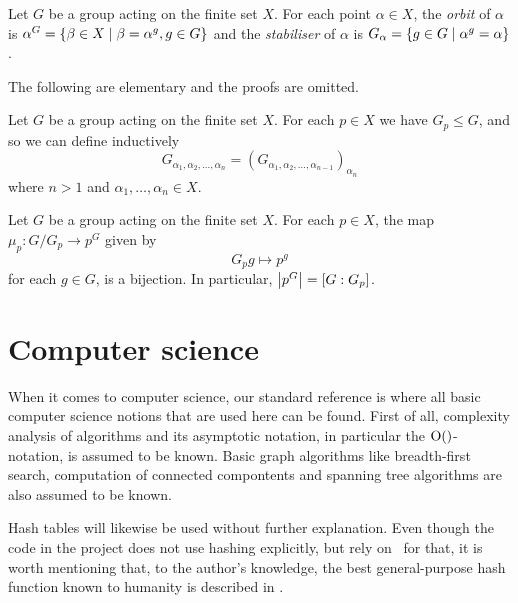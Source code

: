 \begin{deff}
Let $G$ be a group acting on the finite set $X$. For each point
$\alpha \in X$, the \emph{orbit} of $\alpha$ is $\alpha^G = \left\lbrace \beta
\in X \mid \beta = \alpha^g, g \in G \right\rbrace$ and the \emph{stabiliser} of
$\alpha$ is $G_{\alpha} = \left\lbrace g \in G \mid \alpha^g = \alpha \right\rbrace$.
\end{deff}

The following are elementary and the proofs are omitted.
\begin{pr}
Let $G$ be a group acting on the finite set $X$. For each $p \in X$ we have $G_p \leq G$, and so we can define inductively 
\begin{equation}
G_{\alpha_1, \alpha_2, \dotsc, \alpha_n} = (G_{\alpha_1, \alpha_2, \dotsc, \alpha_{n - 1}})_{\alpha_n}
\end{equation}
where $n > 1$ and $\alpha_1, \dotsc, \alpha_n \in X$.
\end{pr}

\begin{pr} \label{thm_orbit_stab}
Let $G$ be a group acting on the finite set $X$. For each $p \in X$, the map $\mu_p : G / G_p \to p^G$ given by
\begin{equation}
G_p g \mapsto p^g
\end{equation}
for each $g \in G$, is a bijection. In particular, $\left\lvert p^G \right\rvert = [G : G_p]$.
\end{pr}

\section{Computer science}
When it comes to computer science, our standard reference is
\cite{clr90} where all basic computer science notions that are used here can be
found. First of all, complexity analysis of algorithms and its
asymptotic notation, in particular the $\operatorname{O} (  )$-notation, is assumed to be
known. Basic graph algorithms like breadth-first search, computation
of connected compontents and spanning tree algorithms are also assumed to be known.

Hash tables will likewise be used without further explanation. Even
though the code in the project does not use hashing explicitly, but
rely on \GAP~for that, it is worth mentioning that, to the author's
knowledge, the best general-purpose hash function known to humanity is
described in \cite{jenkins97}.
